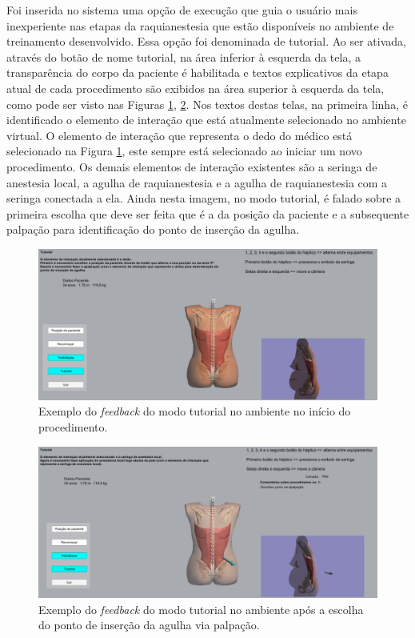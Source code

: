 Foi inserida no sistema uma opção de execução que guia o usuário mais inexperiente nas etapas da raquianestesia que estão disponíveis no ambiente de treinamento desenvolvido. Essa opção foi denominada de tutorial. Ao ser ativada, através do botão de nome tutorial, na área inferior à esquerda da tela, a transparência do corpo da paciente é habilitada e textos explicativos da etapa atual de cada procedimento são exibidos na área superior à esquerda da tela, como pode ser visto nas Figuras \ref{fig:sistemaExecucaoTutorialApalpacao}, \ref{fig:sistemaExecucaoTutorialAnestesiaLocal}. Nos textos destas telas, na primeira linha, é identificado o elemento de interação que está atualmente selecionado no ambiente virtual. O elemento de interação que representa o dedo do médico está selecionado na Figura \ref{fig:sistemaExecucaoTutorialApalpacao}, este sempre está selecionado ao iniciar um novo procedimento. Os demais elementos de interação existentes são a seringa de anestesia local, a agulha de raquianestesia e a agulha de raquianestesia com a seringa conectada a ela. Ainda nesta imagem, no modo tutorial, é falado sobre a primeira escolha que deve ser feita que é a da posição da paciente e a subsequente palpação para identificação do ponto de inserção da agulha. 

\begin{figure}[ht!]
    \centering
    \includegraphics[width=\textwidth]{capitulos/figuras/sistemaExecucaoTutorialApalpacao.png} 
    \caption{Exemplo do \textit{feedback} do modo tutorial no ambiente no início do procedimento.}
    \label{fig:sistemaExecucaoTutorialApalpacao}
\end{figure}

\begin{figure}[ht!]
    \centering
    \includegraphics[width=\textwidth]{capitulos/figuras/sistemaExecucaoTutorialAnestesiaLocal.png} 
    \caption{Exemplo do \textit{feedback} do modo tutorial no ambiente após a escolha do ponto de inserção da agulha via palpação.}
    \label{fig:sistemaExecucaoTutorialAnestesiaLocal}
\end{figure}

